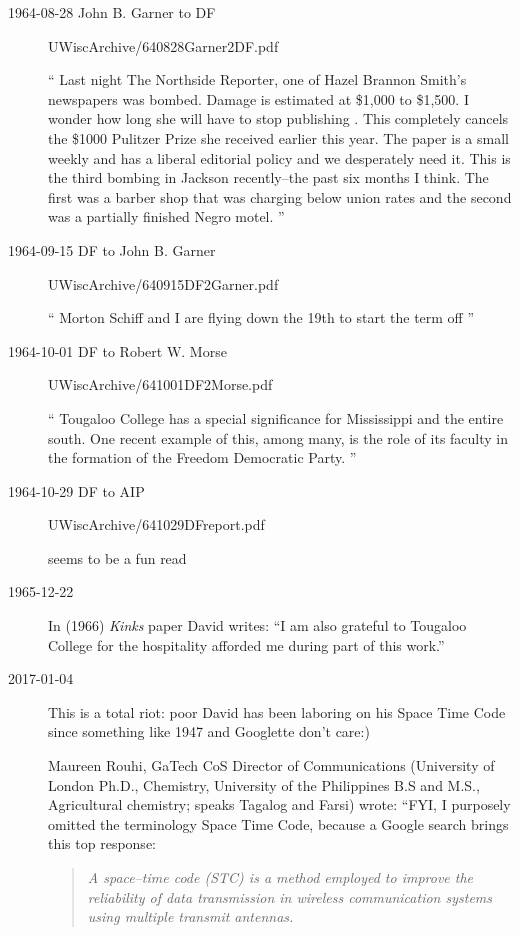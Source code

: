 \begin{description}
\item[1964-08-28 John B. Garner to DF] UWiscArchive/640828Garner2DF.pdf

``
Last night The Northside Reporter, one of Hazel Brannon Smith's newspapers
was bombed. Damage is estimated at \$1,000 to \$1,500. I wonder how long she
will have to stop publishing . This completely cancels the \$1000 Pulitzer
Prize she received earlier this year. The paper is a small weekly and has a
liberal editorial policy and we desperately need it. This is the third
bombing in Jackson recently--the past six months I think. The first was a
barber shop that was charging below union rates and the second was a
partially finished Negro motel.
''

\item[1964-09-15  DF to John B. Garner] UWiscArchive/640915DF2Garner.pdf

``
Morton Schiff and I are flying down the 19th to start the term off
''

\item[1964-10-01  DF to Robert W. Morse] UWiscArchive/641001DF2Morse.pdf

``
Tougaloo College has a special significance for Mississippi and the entire
south. One recent example of this, among many, is the role of its faculty in
the formation of the Freedom Democratic Party.
''


\item[1964-10-29  DF to AIP] UWiscArchive/641029DFreport.pdf

seems to be a fun read

\item[1965-12-22]
In (1966) {\em Kinks} paper David writes: ``I am also grateful
to Tougaloo College for the hospitality afforded me during part of this
work.''

\item[2017-01-04]
This is a total riot: poor David has been laboring on his Space Time Code
since something like 1947 and Googlette don't care:)


 {Maureen Rouhi},
GaTech CoS Director of Communications (University of London
Ph.D., Chemistry, University of the Philippines
B.S and M.S., Agricultural chemistry; speaks Tagalog and Farsi)
wrote:
``FYI, I purposely omitted the terminology Space Time Code, because a
Google search brings this top response:

\begin{quote}
{\em A space–time code (STC) is a method employed to improve the
reliability of data transmission in wireless communication systems using
multiple transmit antennas.}
\end{quote}


\end{description}

\printbibliography[heading=subbibintoc,title={References}]

